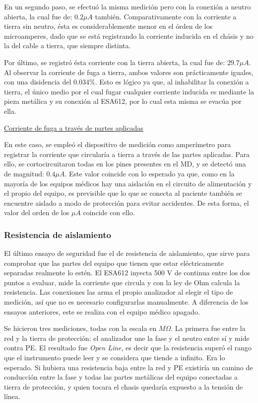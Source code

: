 En un segundo paso, se efectuó la misma medición pero con la conexión a neutro abierta, la cual fue de: $0.2 \mu A$ también. Comparativamente con la corriente a tierra sin neutro, ésta es considerablemente menor en el órden de los microamperes, dado que se está registrando la corriente inducida en el chásis
    y no la del cable a tierra, que siempre distinta. 

Por último, se registró ésta corriente con la tierra abierta, la cual fue de: $29.7 \mu A$. Al observar la corriente de fuga a tierra, ambos valores son prácticamente iguales, con una disidencia del $0.034 \%$. Esto es lógico ya que, al inhabilitar la conexión a tierra, el único medio por el cual fugar
    cualquier corriente inducida es mediante la pieza metálica y su conexión al ESA612, por lo cual esta misma se evacúa por ella.

\underline{Corriente de fuga a través de partes aplicadas}

En este caso, se empleó el dispositivo de medición como amperímetro para registrar la corriente que circularía a tierra a través de las partes aplicadas. Para ello, se cortocircuitaron todas en los pines presentes en el MD, y se detectó una de magnitud: $0.4 \mu A$. Este valor coincide con lo esperado ya que,
    como en la mayoría de los equipos médicos hay una aislación en el circuito de alimentación y el propio del equipo, es previsible que lo que se conecta al paciente también se encuentre aislado a modo de protección para evitar accidentes. De esta forma, el valor del orden de los $\mu A$ coincide con ello.

\subsubsection{Resistencia de aislamiento}

El último ensayo de seguridad fue el de resistencia de aislamiento, que sirve para comprobar que las partes del equipo que tienen que estar eléctricamente separadas realmente lo estén. El ESA612 inyecta 500 V de continua entre los dos puntos a evaluar, mide la corriente que circula y
    con la ley de Ohm calcula la resistencia. Las conexiones las arma el propio analizador al elegir el tipo de medición, así que no es necesario configurarlas manualmente. A diferencia de los ensayos anteriores, este se realiza con el equipo médico apagado.

Se hicieron tres mediciones, todas con la escala en $M\Omega$. La primera fue entre la red y la tierra de protección: el analizador une la fase y el neutro entre sí y mide contra PE. El resultado fue \textit{Open Line}, es decir que la resistencia superó el rango que el instrumento
    puede leer y se considera que tiende a infinito. Era lo esperado. Si hubiera una resistencia baja entre la red y PE existiría un camino de conducción entre la fase y todas las partes metálicas del equipo conectadas a tierra de protección, y quien tocara el chasis quedaría expuesto
    a la tensión de línea.

